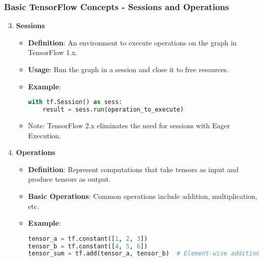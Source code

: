 \documentclass[aspectratio=169]{beamer}
\begin{document}
\begin{frame}[fragile]
    \frametitle{Basic TensorFlow Concepts - Sessions and Operations}
    
    \begin{enumerate}
        \setcounter{enumi}{2}
        \item \textbf{Sessions}
        \begin{itemize}
            \item \textbf{Definition}: An environment to execute operations on the graph in TensorFlow 1.x.
            \item \textbf{Usage}: Run the graph in a session and close it to free resources.
            \item \textbf{Example}:
            \begin{lstlisting}[language=Python]
with tf.Session() as sess:
    result = sess.run(operation_to_execute)
            \end{lstlisting}
            \item Note: TensorFlow 2.x eliminates the need for sessions with Eager Execution.
        \end{itemize}
        
        \item \textbf{Operations}
        \begin{itemize}
            \item \textbf{Definition}: Represent computations that take tensors as input and produce tensors as output.
            \item \textbf{Basic Operations}: Common operations include addition, multiplication, etc.
            \item \textbf{Example}:
            \begin{lstlisting}[language=Python]
tensor_a = tf.constant([1, 2, 3])
tensor_b = tf.constant([4, 5, 6])
tensor_sum = tf.add(tensor_a, tensor_b)  # Element-wise addition
            \end{lstlisting}
        \end{itemize}
    \end{enumerate}
\end{frame}
\end{document}
